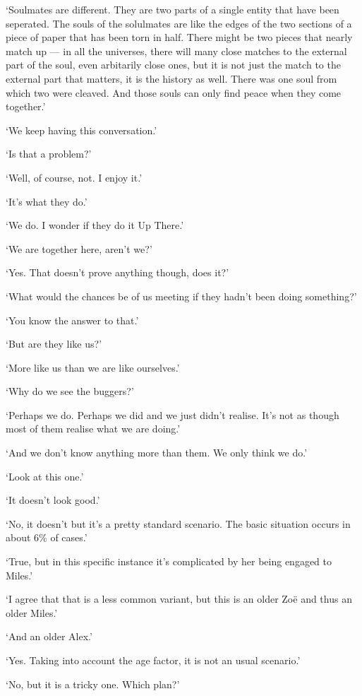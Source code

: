 `Soulmates are different. They are two parts of a single entity that have been seperated. The souls of the solulmates are like the edges of the two sections of a piece of paper that has been torn in half. There might be two pieces that nearly match up --- in all the universes, there will many close matches to the external part of the soul, even arbitarily close ones, but it is not just the match to the external part that matters, it is the history as well. There was one soul from which two were cleaved. And those souls can only find peace when they come together.'

`We keep having this conversation.'

`Is that a problem?'

`Well, of course, not. I enjoy it.'

`It's what they do.'

`{\twelveit We\/} do. I wonder if they do it Up There.'

`We are together here, aren't we?'

`Yes. That doesn't prove anything though, does it?'

`What would the chances be of us meeting if they hadn't been doing something?'

`You know the answer to that.'

`But are they like us?'

`More like us than we are like ourselves.'

`Why do we see the buggers?'

`Perhaps we do. Perhaps we did and we just didn't realise. It's not as though most of {\twelveit them\/} realise what {\twelveit we\/} are doing.'

`And we don't know anything more than them. We only think we do.'

`Look at this one.'

`It doesn't look good.'

`No, it doesn't but it's a pretty standard scenario. The basic situation occurs in about 6\% of cases.'

`True, but in this specific instance it's complicated by her being engaged to Miles.'

`I agree that that is a less common variant, but this is an older Zo{\"e} and thus an older Miles.'

`And an older Alex.'

`Yes. Taking into account the age factor, it is not an usual scenario.'

`No, but it is a tricky one. Which plan?'


